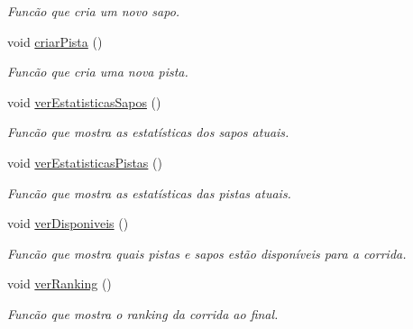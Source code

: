 \begin{DoxyCompactItemize}
\begin{DoxyCompactList}\small\item\em Funcão que cria um novo sapo. \end{DoxyCompactList}\item 
void \hyperlink{classcorrida_ae1e0e8582300c6b8bf67ca28cbbbd0a4}{criar\+Pista} ()\hypertarget{classcorrida_ae1e0e8582300c6b8bf67ca28cbbbd0a4}{}\label{classcorrida_ae1e0e8582300c6b8bf67ca28cbbbd0a4}

\begin{DoxyCompactList}\small\item\em Funcão que cria uma nova pista. \end{DoxyCompactList}\item 
void \hyperlink{classcorrida_af7b148d6c5b0004e53d47c8a86608b0e}{ver\+Estatisticas\+Sapos} ()\hypertarget{classcorrida_af7b148d6c5b0004e53d47c8a86608b0e}{}\label{classcorrida_af7b148d6c5b0004e53d47c8a86608b0e}

\begin{DoxyCompactList}\small\item\em Funcão que mostra as estatísticas dos sapos atuais. \end{DoxyCompactList}\item 
void \hyperlink{classcorrida_aacd20a82887e88cd27382dc516e2cf5e}{ver\+Estatisticas\+Pistas} ()\hypertarget{classcorrida_aacd20a82887e88cd27382dc516e2cf5e}{}\label{classcorrida_aacd20a82887e88cd27382dc516e2cf5e}

\begin{DoxyCompactList}\small\item\em Funcão que mostra as estatísticas das pistas atuais. \end{DoxyCompactList}\item 
void \hyperlink{classcorrida_aa7a6194f73253b7febbd9db2a197c47c}{ver\+Disponiveis} ()\hypertarget{classcorrida_aa7a6194f73253b7febbd9db2a197c47c}{}\label{classcorrida_aa7a6194f73253b7febbd9db2a197c47c}

\begin{DoxyCompactList}\small\item\em Funcão que mostra quais pistas e sapos estão disponíveis para a corrida. \end{DoxyCompactList}\item 
void \hyperlink{classcorrida_a902819f6d516a24979e95a1f110d6d14}{ver\+Ranking} ()\hypertarget{classcorrida_a902819f6d516a24979e95a1f110d6d14}{}\label{classcorrida_a902819f6d516a24979e95a1f110d6d14}

\begin{DoxyCompactList}\small\item\em Funcão que mostra o ranking da corrida ao final. \end{DoxyCompactList}\end{DoxyCompactItemize}
